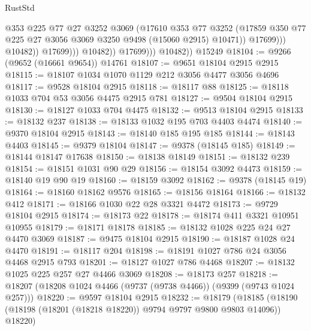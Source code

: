\begin{lexlean}{RustStd}
\begin{coremodule}
                                  @353
                                  @225
                                  @77
                                  @27
                                  @3252
                                  @3069
                                  (@17610
                                    @353
                                    @77
                                    @3252
                                    (@17859
                                      @350
                                      @77
                                      @225
                                      @27
                                      @3056
                                      @3069
                                      @3250
                                      @9498
                                      (@15060 @2915)
                                      @10471))
                                  @17699)))
                            @10482))
                        @17699)))
                  @10482))
              @17699)))
        @10482))
    @15249
@18104 := @9266 (@9652 (@16661 @9654)) @14761
@18107 := @9651 @18104 @2915 @2915
@18115 := @18107 @1034 @1070 @1129 @212 @3056 @4477 @3056 @4696
@18117 := @9528 @18104 @2915
@18118 := @18117 @88
@18125 := @18118 @1033 @704 @53 @3056 @4475 @2915 @781
@18127 := @9504 @18104 @2915
@18130 := @18127 @1033 @704 @4475
@18132 := @9513 @18104 @2915
@18133 := @18132 @237
@18138 := @18133 @1032 @195 @703 @4403 @4474
@18140 := @9370 @18104 @2915
@18143 := @18140 @185 @195 @185
@18144 := @18143 @4403
@18145 := @9379 @18104
@18147 := @9378 (@18145 @185)
@18149 := @18144 @18147 @17638
@18150 := @18138 @18149
@18151 := @18132 @239
@18154 := @18151 @1031 @90 @29
@18156 := @18154 @3092 @4473
@18159 := @18140 @19 @90 @19
@18160 := @18159 @3092
@18162 := @9378 (@18145 @19)
@18164 := @18160 @18162 @9576
@18165 := @18156 @18164
@18166 := @18132 @412
@18171 := @18166 @1030 @22 @28 @3321 @4472
@18173 := @9729 @18104 @2915
@18174 := @18173 @22
@18178 := @18174 @411 @3321 @10951 @10955
@18179 := @18171 @18178
@18185 := @18132 @1028 @225 @24 @27 @4470 @3069
@18187 := @9475 @18104 @2915
@18190 := @18187 @1028 @24 @4470
@18191 := @18117 @204
@18198 := @18191 @1027 @786 @24 @3056 @4468 @2915 @793
@18201 := @18127 @1027 @786 @4468
@18207 := @18132 @1025 @225 @257 @27 @4466 @3069
@18208 := @18173 @257
@18218 := @18207 (@18208 @1024 @4466 (@9737 (@9738 @4466)) (@9399 (@9743 @1024 @257)))
@18220 := @9597 @18104 @2915
@18232 := @18179
    (@18185 (@18190 (@18198 (@18201 (@18218 @18220)) @9794 @9797 @9800 @9803 @14096)) @18220)

\end{coremodule}
\end{lexlean}
